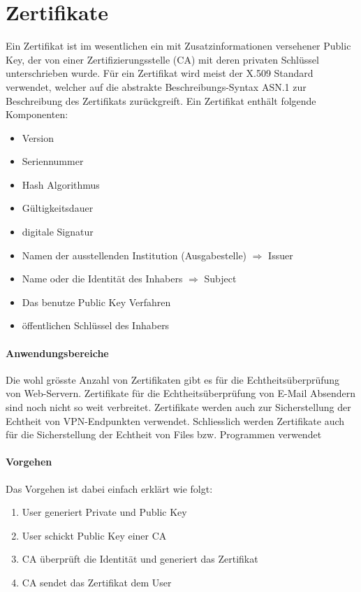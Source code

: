 \section{Zertifikate}
Ein Zertifikat ist im wesentlichen ein mit Zusatzinformationen versehener Public Key, der von einer Zertifizierungsstelle (CA) mit deren privaten Schlüssel unterschrieben wurde. Für ein Zertifikat wird meist der X.509 Standard verwendet, welcher auf die abstrakte Beschreibungs-Syntax ASN.1 zur Beschreibung des Zertifikats zurückgreift. Ein Zertifikat enthält folgende Komponenten:
\begin{itemize}
	\item Version
	\item Seriennummer
	\item Hash Algorithmus
	\item Gültigkeitsdauer
	\item digitale Signatur
	\item Namen der ausstellenden Institution (Ausgabestelle) $\Rightarrow$ Issuer
	\item Name oder die Identität des Inhabers $\Rightarrow$ Subject
	\item Das benutze Public Key Verfahren
	\item öffentlichen Schlüssel des Inhabers
\end{itemize} 

\paragraph{Anwendungsbereiche}
Die wohl grösste Anzahl von Zertifikaten gibt es für die Echtheitsüberprüfung von Web-Servern. Zertifikate für die Echtheitsüberprüfung von E-Mail Absendern sind noch nicht so weit verbreitet. Zertifikate werden auch zur Sicherstellung der
Echtheit von VPN-Endpunkten verwendet. Schliesslich werden Zertifikate auch für die Sicherstellung der Echtheit von Files bzw. Programmen verwendet

\paragraph{Vorgehen}
Das Vorgehen ist dabei einfach erklärt wie folgt:
\begin{enumerate}
	\item User generiert Private und Public Key
	\item User schickt Public Key einer CA
	\item CA überprüft die Identität und generiert das Zertifikat
	\item CA sendet das Zertifikat dem User
\end{enumerate}

